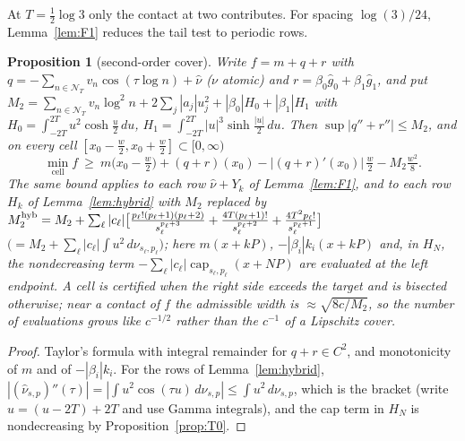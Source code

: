\documentclass[10pt]{amsart}
\newtheorem{proposition}[theorem]{Proposition}
\theoremstyle{definition}
\theoremstyle{remark}
\newcommand{\gh}[1]{\widehat g_{#1}}
\newcommand{\nuh}{\widehat\nu}
\newcommand{\NT}{\mathcal N_T}
\begin{document}
At $T=\tfrac12\log3$ only the contact at two contributes. For spacing
$\log(3)/24$, Lemma~\ref{lem:F1} reduces the tail test to periodic rows.

\begin{proposition}[second-order cover]\label{prop:TAY}
Write $f=m+q+r$ with $q=-\sum_{n\in\NT}v_n\cos(\tau\log n)+\nuh$ ($\nu$ atomic) and
$r=\beta_0\gh0+\beta_1\gh1$, and put
$M_2=\sum_{n\in\NT}v_n\log^2n+2\sum_j|a_j|u_j^2+|\beta_0|H_0+|\beta_1|H_1$ with
$H_0=\int_{-2T}^{2T}u^2\cosh\frac u2\,du$, $H_1=\int_{-2T}^{2T}|u|^3\sinh\frac{|u|}2\,du$. Then
$\sup|q''+r''|\le M_2$, and on every cell $[x_0-\frac w2,x_0+\frac w2]\subset[0,\infty)$
\[
\min_{\text{cell}}f\ \ge\ m\!\big(x_0-\tfrac w2\big)+(q+r)(x_0)-|(q+r)'(x_0)|\,\tfrac w2-M_2\tfrac{w^2}8 .
\]
The same bound applies to each row $\nuh+Y_k$ of Lemma~\ref{lem:F1}, and to each row $H_k$ of
Lemma~\ref{lem:hybrid} with $M_2$ replaced by
$M_2^{\rm hyb}=M_2+\sum_\ell|c_\ell|\big[\tfrac{p_\ell!(p_\ell+1)(p_\ell+2)}{s_\ell^{p_\ell+3}}+\tfrac{4T(p_\ell+1)!}{s_\ell^{p_\ell+2}}+\tfrac{4T^2p_\ell!}{s_\ell^{p_\ell+1}}\big]$
$\big(=M_2+\sum_\ell|c_\ell|\int u^2\,d\nu_{s_\ell,p_\ell}\big)$; here $m(x+kP)$, $-|\beta_i|k_i(x+kP)$ and, in $H_N$,
the nondecreasing term $-\sum_\ell|c_\ell|\operatorname{cap}_{s_\ell,p_\ell}(x+NP)$ are evaluated at the left endpoint. A cell is certified when the
right side exceeds the target and is bisected otherwise; near a contact of $f$ the admissible width
is $\approx\sqrt{8c/M_2}$, so the number of evaluations grows like $c^{-1/2}$ rather than the
$c^{-1}$ of a Lipschitz cover.
\end{proposition}
\begin{proof}
Taylor's formula with integral remainder for $q+r\in C^2$, and monotonicity of $m$ and of
$-|\beta_i|k_i$. For the rows of Lemma~\ref{lem:hybrid}, $|(\nuh_{s,p})''(\tau)|=|\int u^2\cos(\tau u)\,d\nu_{s,p}|\le\int u^2\,d\nu_{s,p}$,
which is the bracket (write $u=(u-2T)+2T$ and use Gamma integrals), and the cap term in $H_N$ is
nondecreasing by Proposition~\ref{prop:T0}.
\end{proof}
\end{document}

